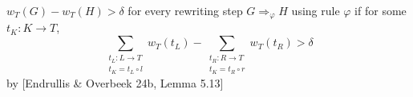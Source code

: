 \documentclass{beamer}
\begin{document}
\begin{frame}{ $w_T(G) - w_T(H) > \delta$ for every rewriting step $G \Rightarrow_\varphi H$ using rule $\varphi$ if}
for some $t_K: K \rightarrow T$,
$$ \sum_{\substack{t_L: L \rightarrow T\\ t_K = t_L \circ l}}
        w_T(t_L) - \sum_{\substack{t_R: R \rightarrow T\\ t_K = t_R \circ r}}
            w_T(t_R) > \delta $$ 
  by [Endrullis \& Overbeek 24b, Lemma 5.13]
\end{frame}
\end{document}
